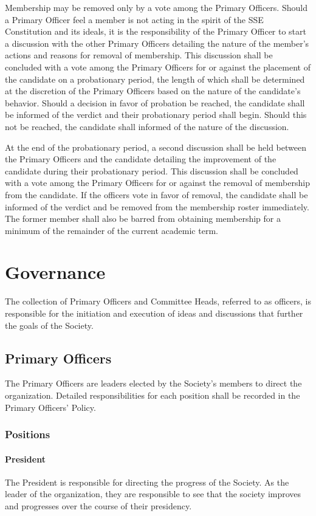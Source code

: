 \documentclass[american]{article}
\begin{document}
Membership may be removed only by a vote among the Primary Officers. Should a Primary Officer feel a member is not acting in the spirit of the SSE Constitution and its ideals, it is the responsibility of the Primary Officer to start a discussion with the other Primary Officers detailing the nature of the member's actions and reasons for removal of membership. This discussion shall be concluded with a vote among the Primary Officers for or against the placement of the candidate on a probationary period, the length of which shall be determined at the discretion of the Primary Officers based on the nature of the candidate's behavior. Should a decision in favor of probation be reached, the candidate shall be informed of the verdict and their probationary period shall begin. Should this not be reached, the candidate shall informed of the nature of the discussion.

At the end of the probationary period, a second discussion shall be held between the Primary Officers and the candidate detailing the improvement of the candidate during their probationary period. This discussion shall be concluded with a vote among the Primary Officers for or against the removal of membership from the candidate. If the officers vote in favor of removal, the candidate shall be informed of the verdict and be removed from the membership roster immediately. The former member shall also be barred from obtaining membership for a minimum of the remainder of the current academic term.

\section{Governance}
The collection of Primary Officers and Committee Heads, referred to as officers, is responsible for the initiation and execution of ideas and discussions that further the goals of the Society.

\subsection{Primary Officers}
The Primary Officers are leaders elected by the Society's members to direct the organization. Detailed responsibilities for each position shall be recorded in the Primary Officers' Policy.

\subsubsection{Positions}
\paragraph{President}
The President is responsible for directing the progress of the Society. As the leader of the organization, they are responsible to see that the society improves and progresses over the course of their presidency.
\end{document}
